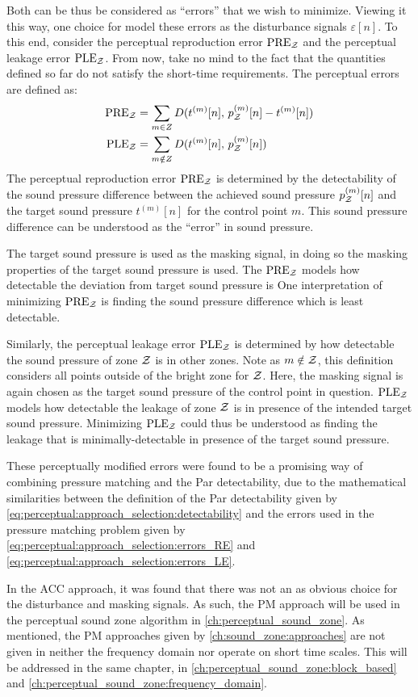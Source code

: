Both can be thus be considered as ``errors'' that we wish to minimize.
Viewing it this way, one choice for model these errors as the disturbance signals $\varepsilon[n]$.
To this end, consider the perceptual reproduction error $\text{PRE}_{\mathcal{Z}}$ and the perceptual leakage error $\text{PLE}_{\mathcal{Z}}$.
From now, take no mind to the fact that the quantities defined so far do not satisfy the short-time requirements. 
The perceptual errors are defined as: 
\begin{align}
    \text{PRE}_{\mathcal{Z}} &= \sum_{m\in Z} D(t^{(m)}[n],\,p_{\mathcal{Z}}^{(m)}[n] - t^{(m)}[n]) \\
    \text{PLE}_{\mathcal{Z}} &= \sum_{m\notin Z} D(t^{(m)}[n],\,p_{\mathcal{Z}}^{(m)}[n])  
\end{align}
The perceptual reproduction error $\text{PRE}_{\mathcal{Z}}$ is determined by the detectability of the sound pressure difference between the achieved sound
pressure $p_{\mathcal{Z}}^{(m)}[n]$ and the target sound pressure $t^{(m)}[n]$ for the control point $m$.
This sound pressure difference can be understood as the ``error'' in sound pressure.

The target sound pressure is used as the masking signal, in doing so the masking properties of the target sound pressure is used.
The $\text{PRE}_{\mathcal{Z}}$ models how detectable the deviation from target sound pressure is
One interpretation of minimizing $\text{PRE}_{\mathcal{Z}}$ is finding the sound pressure difference which is least detectable. 

Similarly, the perceptual leakage error $\text{PLE}_{\mathcal{Z}}$ is determined by how detectable the sound pressure of zone $\mathcal{Z}$ is in other zones.
Note as $m\notin\mathcal{Z}$, this definition considers all points outside of the bright zone for $\mathcal{Z}$.  
Here, the masking signal is again chosen as the target sound pressure of the control point in question.
$\text{PLE}_{\mathcal{Z}}$ models how detectable the leakage of zone $\mathcal{Z}$ is in presence of the intended target sound pressure. 
Minimizing $\text{PLE}_{\mathcal{Z}}$ could thus be understood as finding the leakage that is minimally-detectable in presence of the target sound pressure.

These perceptually modified errors were found to be a promising way of combining pressure matching and the Par detectability,
due to the mathematical similarities between the definition of the Par detectability given by \autoref{eq:perceptual:approach_selection:detectability}
and the errors used in the pressure matching problem given by \autoref{eq:perceptual:approach_selection:errors_RE} and 
\autoref{eq:perceptual:approach_selection:errors_LE}.

In the ACC approach, it was found that there was not an as obvious choice for the disturbance and masking signals.
As such, the PM approach will be used in the perceptual sound zone algorithm in \autoref{ch:perceptual_sound_zone}.
As mentioned, the PM approaches given by \autoref{ch:sound_zone:approaches} are not given in neither the frequency domain nor operate on short time scales.
This will be addressed in the same chapter, in \autoref{ch:perceptual_sound_zone:block_based} and \autoref{ch:perceptual_sound_zone:frequency_domain}.

